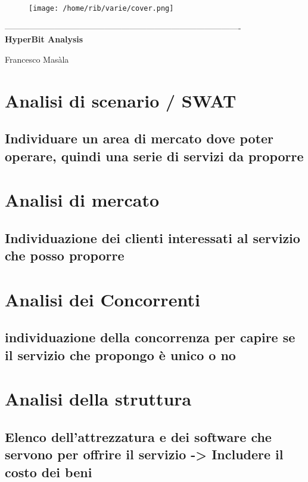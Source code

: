 \documentclass{article}
\begin{document}
    \begin{titlepage}
    \begin{center}
\begin{figure}[h]
    \centering
    \texttt{[image: /home/rib/varie/cover.png]}
    \label{fig:logo}
\end{figure}
-------------------------------------------------------------------------------------\\
\vspace{2\baselineskip}
\Huge{\textbf{HyperBit Analysis}}\\
\vfill

\LARGE{Francesco Masàla}\\
\vfill
\end{center}
\end{titlepage}
\tableofcontents
\vspace{4\baselineskip}
\section{Analisi di scenario / SWAT}
\subsection{Individuare un area di mercato dove poter operare, quindi una serie di servizi da proporre }

\section{Analisi di mercato}
\subsection{Individuazione dei clienti interessati al servizio che posso proporre}

\section{Analisi dei Concorrenti}
\subsection{individuazione della concorrenza per capire se il servizio che propongo è unico o no}

\section{Analisi della struttura}
\subsection{Elenco dell'attrezzatura e dei software che servono per offrire il servizio -> Includere il costo dei beni}
\end{document}
